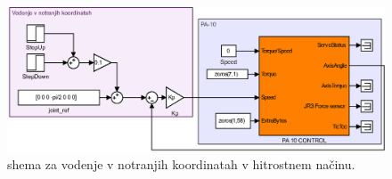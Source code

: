 \begin{figure}[]
	\centering
	\includegraphics[width=\textwidth]{./Slike/notranje_koordinate_vel.eps}
	\caption{\simulink shema za vodenje v notranjih koordinatah v hitrostnem na\v{c}inu.}
	\label{fig:notranje_koordinate_vel}
\end{figure}
